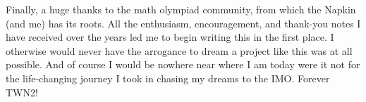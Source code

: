 Finally, a huge thanks to the math olympiad community,
from which the Napkin (and me) has its roots.
All the enthusiasm, encouragement, and thank-you notes I have received
over the years led me to begin writing this in the first place.
I otherwise would never have the arrogance to dream a project like this
was at all possible.
And of course I would be nowhere near where I am today were it not for the
life-changing journey I took in chasing my dreams to the IMO\@.
Forever TWN2!
